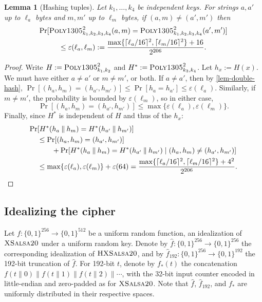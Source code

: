 \documentclass[draft]{article}
\newtheorem{lemma}{Lemma}
\DeclareRobustCommand{\operatorsc}[1]{{%
  \ifmmode\let\next=\operatorname\else\let\next=\relax\fi\next{\textsc{#1}}}}
\def\XSalsa#1/{\operatorsc{XSalsa#1}}
\def\HXSalsa#1/{\operatorsc{HXSalsa#1}}
\def\Poly#1/{\operatorsc{Poly#1}}
\newcommand{\concat}{\mathbin\|}
\newcommand{\given}{\mathrel|}
\newcommand{\collisionbound}{\varepsilon}
\begin{document}
\begin{lemma}[Hashing tuples]\label{lem-hash-tuple}
  Let $k_1, \dotsc, k_4$ be independent \Poly1305/ keys.
  For strings $a, a'$ up to $\ell_a$ bytes and $m, m'$ up to $\ell_m$
   bytes, if $(a, m) \ne (a', m')$ then
%
  \begin{multline*}
    \Pr[\Poly1305/^2_{k_1,k_2,k_3,k_4}(a, m)
        = \Poly1305/^2_{k_1,k_2,k_3,k_4}(a', m')] \\
    \leq \collisionbound(\ell_a, \ell_m)
    := \frac{\max\{\lceil\ell_a/16\rceil^2, \lceil\ell_m/16\rceil^2\}
             + 16}
            {2^{206}}.
  \end{multline*}
\end{lemma}

\begin{proof}
  Write
   $H := \Poly1305/^2_{k_1,k_2}$ and
   $H^* := \Poly1305/^2_{k_3,k_4}$.
  Let $h_x := H(x)$.
  We must have either $a \ne a'$ or $m \ne m'$, or both.
  If $a \ne a'$, then by \autoref{lem-double-hash},
   $\Pr[(h_a, h_m) = (h_{a'}, h_{m'})]
    \leq \Pr[h_a = h_{a'}]
    \leq \collisionbound(\ell_a)$.
  Similarly, if $m \ne m'$, the probability is bounded by
   $\collisionbound(\ell_m)$,
   so in either case,
  \[
    \Pr[(h_a, h_m) = (h_{a'}, h_{m'})]
    \leq \max\{\collisionbound(\ell_a), \collisionbound(\ell_m)\}.
  \]
  Finally, since $H^*$ is independent of $H$ and thus of the $h_x$:
%
  \begin{align*}
    \Pr&[H^*(h_a \concat h_m) = H^*(h_{a'} \concat h_{m'})] \\
    &\leq \Pr[(h_a, h_m) = (h_{a'}, h_{m'})] \\
    &\qquad
          + \Pr[H^*(h_a \concat h_m) = H^*(h_{a'} \concat h_{m'})
                \given (h_a, h_m) \ne (h_{a'}, h_{m'})] \\
    &\leq \max\{\collisionbound(\ell_a), \collisionbound(\ell_m)\}
          + \collisionbound(64)
     = \frac{\max\{\lceil\ell_a/16\rceil^2, \lceil\ell_m/16\rceil^2\}
             + 4^2}
            {2^{206}}.
    \qedhere
  \end{align*}
\end{proof}

\newpage

\subsection{Idealizing the cipher}

Let $f\colon \{0,1\}^{256} \to \{0,1\}^{512}$ be a uniform random
 function, an idealization of $\XSalsa20/$ under a uniform random key.
Denote by
 $\hat f\colon \{0,1\}^{256} \to \{0,1\}^{256}$
 the corresponding idealization of $\HXSalsa20/$, and by
 $\hat f_{192}\colon \{0,1\}^{256} \to \{0,1\}^{192}$
 the 192-bit truncation of $\hat f$.
For 192-bit $t$, denote by $f_*(t)$ the concatenation
 $f(t \concat 0) \concat f(t \concat 1) \concat f(t \concat 2) \concat \dotsb$,
 with the 32-bit input counter encoded in little-endian and zero-padded
 as for $\XSalsa20/$.
Note that $\hat f$, $\hat f_{192}$, and $f_*$ are uniformly
 distributed in their respective spaces.
\end{document}
